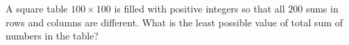 \problem
A square table $100 \times 100$ is filled with positive integers so that all
$200$ sums in rows and columns are different.
What is the least possible value of total sum of numbers in the table?

\solution

\endproblem
